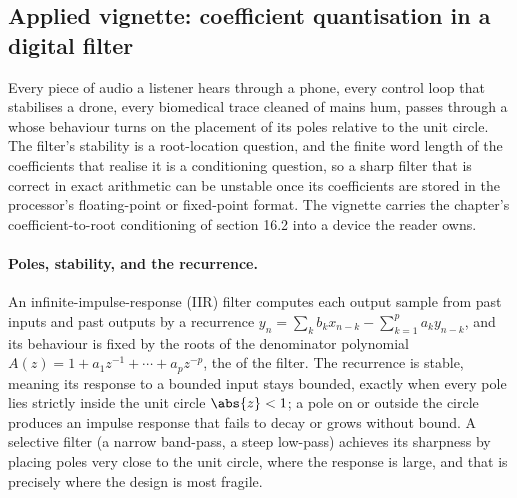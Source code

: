 \subsection{Applied vignette: coefficient quantisation in a digital filter}

Every piece of audio a listener hears through a phone, every control loop
that stabilises a drone, every biomedical trace cleaned of mains hum, passes
through a  whose behaviour turns on the
placement of its poles relative to the unit circle. The filter's stability is
a root-location question, and the finite word length of the coefficients that
realise it is a conditioning question, so a sharp filter that is correct in
exact arithmetic can be unstable once its coefficients are stored in the
processor's floating-point or fixed-point format. The vignette carries the
chapter's coefficient-to-root conditioning of section 16.2 into a device the
reader owns.

\paragraph{Poles, stability, and the recurrence.}
An infinite-impulse-response (IIR) filter computes each output sample from
past inputs and past outputs by a recurrence $y_{n} = \sum_{k} b_{k}
x_{n-k} - \sum_{k=1}^{p} a_{k} y_{n-k}$, and its behaviour is fixed by the
roots of the denominator polynomial $A(z) = 1 + a_{1} z^{-1} + \cdots +
a_{p} z^{-p}$, the  of the filter. The recurrence is stable,
meaning its response to a bounded input stays bounded, exactly when every
pole lies strictly inside the unit circle $\abs{z} < 1$; a pole on or outside
the circle produces an impulse response that fails to decay or grows without
bound. A selective filter (a narrow band-pass, a steep low-pass) achieves its
sharpness by placing poles very close to the unit circle, where the response
is large, and that is precisely where the design is most fragile.

